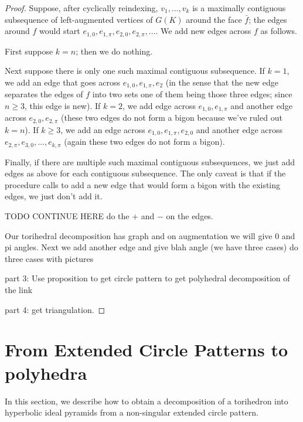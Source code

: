 \documentclass[11pt]{amsart}
\theoremstyle{plain}
\theoremstyle{definition}
\begin{document}
\begin{proof}
Suppose, after cyclically reindexing, $v_1,\ldots,v_k$
is a maximally contiguous subsequence of left-augmented vertices
of $G(K)$ around the face $\bar{f}$;
the edges around $f$ would start
$e_{1,0}, e_{1,\pi}, e_{2,0}, e_{2,\pi}, \ldots$.
We add new edges across $f$ as follows.

First suppose $k=n$; then we do nothing.

Next suppose there is only one such maximal contiguous subsequence.
If $k = 1$, we add an edge that goes across
$e_{1,0},e_{1,\pi},e_2$
(in the sense that the new edge separates the edges of $f$ into two sets
one of them being those three edges;
since $n\geq 3$, this edge is new).
If $k = 2$, we add edge across $e_{1,0},e_{1,\pi}$
and another edge across $e_{2,0},e_{2,\pi}$
(these two edges do not form a bigon because we've ruled out $k=n$).
If $k \geq 3$,
we add an edge across $e_{1,0},e_{1,\pi},e_{2,0}$
and another edge across $e_{2,\pi},e_{3,0},\ldots,e_{k,\pi}$
(again these two edges do not form a bigon).

Finally, if there are multiple such maximal contiguous subsequences,
we just add edges as above for each contiguous subsequence.
The only caveat is that if the procedure calls to add a new edge
that would form a bigon with the existing edges,
we just don't add it.


TODO CONTINUE HERE do the $+$ and $-$ on the edges.




Our torihedral decomposition has graph and on augmentation we will give 0 and pi angles. Next we add another edge and give blah angle (we have three cases)
do three cases with pictures

part 3: Use proposition to get circle pattern to get polyhedral decomposition of the link 

part 4: get triangulation.  

\end{proof}



\section{From Extended Circle Patterns to polyhedra}

In this section, we describe how to obtain a
decomposition of a torihedron
into hyperbolic ideal pyramids
from a non-singular extended circle pattern.
\end{document}
